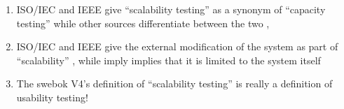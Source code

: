 \begin{enumerate}
    \item %
          \ifnotpaper \citeauthor{IEEE2021} \else ISO/IEC and IEEE \fi give
          ``scalability testing'' as a synonym of ``capacity testing''
          \ifnotpaper \citeyearpar[p.~39]{IEEE2021} \else \cite[p.~39]{IEEE2021}
          \fi while other sources differentiate between the two
          \ifnotpaper \citetext{\citealp[p.~53]{Firesmith2015};
                  \citealp[pp.~22-23]{Bas2024}}
          \else \citep[p.~53]{Firesmith2015}, \citep[pp.~22-23]{Bas2024}
          \fi
    \item %
          \ifnotpaper \citeauthor{IEEE2021} \else ISO/IEC and IEEE \fi give
          the external modification of the system as part of ``scalability''
          \ifnotpaper \citeyearpar[p.~39]{IEEE2021}\else
              \cite[p.~39]{IEEE2021}\fi, while \citet{ISO_IEC2023a} \ifnotpaper
              imply \else implies \fi that it is limited to the system itself
    \item %
          The \acs{swebok} V4's definition of ``scalability testing''
          \citep[p.~5-9]{SWEBOK2024} is really a definition of usability
          testing!
\end{enumerate}



